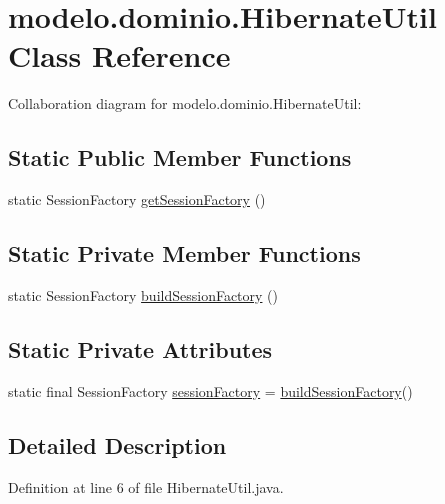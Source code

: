 \hypertarget{classmodelo_1_1dominio_1_1HibernateUtil}{}\section{modelo.\+dominio.\+Hibernate\+Util Class Reference}
\label{classmodelo_1_1dominio_1_1HibernateUtil}


Collaboration diagram for modelo.\+dominio.\+Hibernate\+Util\+:
\subsection*{Static Public Member Functions}
\begin{DoxyCompactItemize}
\item 
static Session\+Factory \mbox{\hyperlink{classmodelo_1_1dominio_1_1HibernateUtil_a9fd7b033d7c11fe7373e9d4c3dc556af}{get\+Session\+Factory}} ()
\end{DoxyCompactItemize}
\subsection*{Static Private Member Functions}
\begin{DoxyCompactItemize}
\item 
static Session\+Factory \mbox{\hyperlink{classmodelo_1_1dominio_1_1HibernateUtil_a6a87317e9238a2010699289fbbc9be91}{build\+Session\+Factory}} ()
\end{DoxyCompactItemize}
\subsection*{Static Private Attributes}
\begin{DoxyCompactItemize}
\item 
static final Session\+Factory \mbox{\hyperlink{classmodelo_1_1dominio_1_1HibernateUtil_a9d3cf851e2a9db5174c8cf9a5cc1dcad}{session\+Factory}} = \mbox{\hyperlink{classmodelo_1_1dominio_1_1HibernateUtil_a6a87317e9238a2010699289fbbc9be91}{build\+Session\+Factory}}()
\end{DoxyCompactItemize}


\subsection{Detailed Description}


Definition at line 6 of file Hibernate\+Util.\+java.



